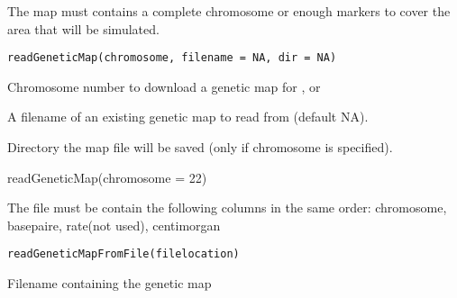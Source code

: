 \documentclass[letterpaper]{book}
\begin{document}
%
\begin{Description}\relax
The map must contains a complete chromosome or enough markers to cover the area that
will be simulated.
\end{Description}
%
\begin{Usage}
\begin{verbatim}
readGeneticMap(chromosome, filename = NA, dir = NA)
\end{verbatim}
\end{Usage}
%
\begin{Arguments}
\begin{ldescription}
\item[\code{chromosome}] Chromosome number to download a genetic map for , or

\item[\code{filename}] A filename of an existing genetic map to read from (default NA).

\item[\code{dir}] Directory the map file will be saved (only if chromosome is specified).
\end{ldescription}
\end{Arguments}
%
\begin{Examples}
\begin{ExampleCode}




readGeneticMap(chromosome = 22)



\end{ExampleCode}
\end{Examples}
%
\begin{Description}\relax
The file must be contain the following columns in the same order: chromosome, basepaire, rate(not used), centimorgan
\end{Description}
%
\begin{Usage}
\begin{verbatim}
readGeneticMapFromFile(filelocation)
\end{verbatim}
\end{Usage}
%
\begin{Arguments}
\begin{ldescription}
\item[\code{filelocation}] Filename containing the genetic map
\end{ldescription}
\end{Arguments}
\end{document}
